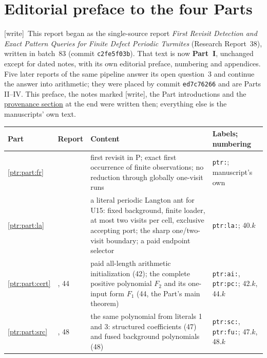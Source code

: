 \documentclass[11pt,letterpaper]{article}
\theoremstyle{definition}\newtheorem{definition}[theorem]{Definition}
\theoremstyle{remark}\newtheorem{remark}[theorem]{Remark}
\newcommand{\wtag}{\textup{[write]}}
\begin{document}
\setcounter{tocdepth}{1}\tableofcontents

\clearpage
{}\label{ptr:sec:overview}
\section*{Editorial preface to the four Parts}
\wtag\ This report began as the single-source report \emph{First Revisit
Detection and Exact Pattern Queries for Finite Defect Periodic Turmites}
(Research Report~38), written in batch~83 (commit \texttt{c2fe5f03b}). That
text is now \textbf{Part~I}, unchanged except for dated notes, with its own
editorial preface, numbering and appendices. Five later reports of the same
pipeline answer its open question~3 and continue the answer into arithmetic;
they were placed by commit \texttt{ed7c76266} and are Parts II--IV. This
preface, the notes marked \wtag, the Part introductions and the
\hyperref[ptr:sec:prov88]{provenance section} at the end were written then;
everything else is the manuscripts' own text.

\begin{center}\small
\begin{tabular}{@{}>{\raggedright\arraybackslash}p{}>{\raggedright\arraybackslash}p{}>{\raggedright\arraybackslash}p{}>{\raggedright\arraybackslash}p{}@{}}
\toprule
Part & Report & Content & Labels; numbering\\
\midrule
\ref{ptr:part:fr} & 38 & first revisit in P; exact first occurrence of finite observations; no reduction through globally one-visit runs & \texttt{ptr:}; manuscript's own\\
\ref{ptr:part:la} & 40 & a literal periodic Langton ant for U15: fixed background, finite loader, at most two visits per cell, exclusive accepting port; the sharp one/two-visit boundary; a paid endpoint selector & \texttt{ptr:la:}; 40.$k$\\
\ref{ptr:part:cert} & 42, 44 & paid all-length arithmetic initialization (42); the complete positive polynomial $F_2$ and its one-input form $F_1$ (44, the Part's main theorem) & \texttt{ptr:ai:}, \texttt{ptr:pc:}; 42.$k$, 44.$k$\\
\ref{ptr:part:src} & 47, 48 & the same polynomial from literals 1 and 3: structured coefficients (47) and fused background polynomials (48) & \texttt{ptr:sc:}, \texttt{ptr:fu:}; 47.$k$, 48.$k$\\
\bottomrule
\end{tabular}
\end{center}
\end{document}
